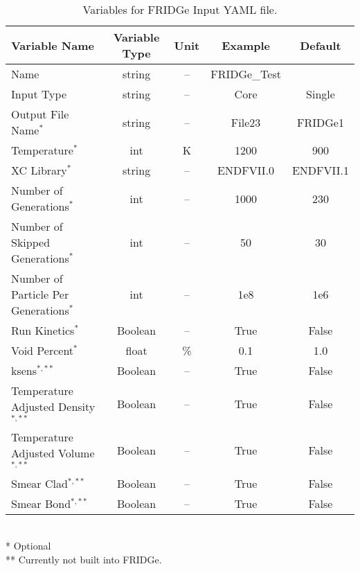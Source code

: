 \documentclass{article}
\begin{document}
\begin{table}
	\centering
	\caption{Variables for FRIDGe Input YAML file.}
	\begin{tabular}{lcccc}\toprule
		Variable Name   & Variable Type & Unit & Example & Default 
		\\
		\hline
    	Name  & string & -- & FRIDGe\_Test & 
		\\
    	Input Type  & string & -- & Core & Single
		\\
    	Output File Name$^*$  & string & -- & File23 & FRIDGe1
		\\				
		Temperature$^*$ & int & K & 1200 & 900
		\\		
		XC Library$^*$ & string & -- & ENDFVII.0 & ENDFVII.1
		\\
		Number of Generations$^*$ & int & -- & 1000 & 230
		\\
		Number of Skipped Generations$^*$ & int & -- & 50 & 30
		\\	
		Number of Particle Per Generations$^*$ & int & -- & 1e8 & 1e6
		\\			
	    Run Kinetics$^*$ & Boolean & -- & True & False
		\\
		Void Percent$^*$ & float & \% & 0.1 & 1.0
		\\	
	    ksens$^{*,**}$ & Boolean & -- & True & False
		\\
	    Temperature Adjusted Density$^{*,**}$ & Boolean & -- & True & False
		\\
	    Temperature Adjusted Volume$^{*,**}$ & Boolean& -- & True & False
		\\
	    Smear Clad$^{*,**}$ & Boolean & -- & True & False
		\\	
	    Smear Bond$^{*,**}$ & Boolean & -- & True & False
		\\
		\bottomrule
	\end{tabular}
	\\
	* Optional
	\\
	** Currently not built into FRIDGe.
	\label{tab:input}
\end{table}
\end{document}

